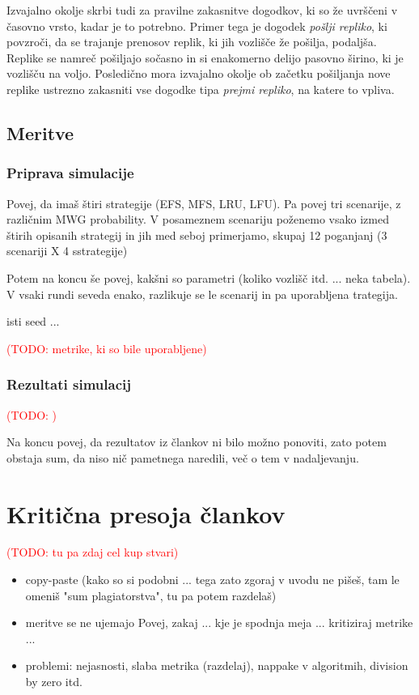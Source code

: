 \documentclass[a4paper, 12pt]{book}
\newcommand{\TODO}[1]{\textcolor{red}{(TODO: #1)}}
\begin{document}
Izvajalno okolje skrbi tudi za pravilne zakasnitve dogodkov, ki so že uvrščeni
v časovno vrsto, kadar je to potrebno. Primer tega je dogodek
\textit{pošlji repliko}, ki povzroči, da se trajanje prenosov replik, ki
jih vozlišče že pošilja, podaljša. Replike se namreč pošiljajo sočasno in si
enakomerno delijo pasovno širino, ki je vozlišču na voljo. Posledično mora
izvajalno okolje ob začetku pošiljanja nove replike ustrezno zakasniti vse
dogodke tipa \textit{prejmi repliko}, na katere to vpliva.


\section{Meritve}
\subsection{Priprava simulacije}
Povej, da imaš štiri strategije (EFS, MFS, LRU, LFU). Pa povej tri scenarije,
z različnim MWG probability. V posameznem scenariju poženemo vsako izmed
štirih opisanih strategij in jih med seboj primerjamo, skupaj 12 poganjanj
(3 scenariji X 4 sstrategije)

Potem na koncu še povej, kakšni so parametri (koliko vozlišč itd. ... neka
tabela). V vsaki rundi seveda enako, razlikuje se le scenarij in pa
uporabljena trategija.

isti seed ...

\TODO{metrike, ki so bile uporabljene}

\subsection{Rezultati simulacij}

\TODO{}

Na koncu povej, da rezultatov iz člankov ni bilo možno ponoviti, zato potem
obstaja sum, da niso nič pametnega naredili, več o tem v nadaljevanju.

\chapter{Kritična presoja člankov}

\TODO{tu pa zdaj cel kup stvari}

\begin{itemize}
\item copy-paste (kako so si podobni ... tega zato zgoraj v uvodu ne pišeš, tam
le omeniš "sum plagiatorstva", tu pa potem razdelaš)

\item meritve se ne ujemajo
Povej, zakaj ... kje je spodnja meja ... kritiziraj metrike ...

\item problemi: nejasnosti, slaba metrika (razdelaj), nappake v algoritmih,
division by zero itd.

\end{itemize}
\end{document}
